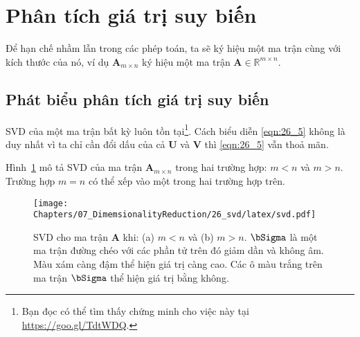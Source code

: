  
 
\section{Phân tích giá trị suy biến}
Để hạn chế nhầm lẫn trong các phép toán, ta sẽ ký hiệu một ma trận cùng với kích thước của nó, ví dụ $\mathbf{A}_{m \times n}$ ký hiệu một ma trận
$\mathbf{A} \in \mathbb{R}^{m \times n}$.
 
\subsection{Phát biểu phân tích giá trị suy biến}
{}

 
SVD của một ma trận bất kỳ luôn tồn tại\footnote{Bạn đọc có thể tìm thấy chứng
minh cho việc này tại \url{https://goo.gl/TdtWDQ}.}. Cách biểu diễn
\eqref{eqn:26_5} không là duy nhất vì ta chỉ cần đổi dấu của cả $\mathbf{U}$ và
$\mathbf{V}$ thì \eqref{eqn:26_5} vẫn thoả mãn.
 
Hình~\ref{fig:26_1} mô tả SVD của ma trận $\mathbf{A}_{m \times n}$ trong hai
trường hợp: $m < n$ và $m > n$. Trường hợp $m =n$ có thể xếp vào một trong hai
trường hợp trên.

\begin{figure}[t]
\centering
    \texttt{[image: Chapters/07\_DimemsionalityReduction/26\_svd/latex/svd.pdf]}
    \caption[]{SVD cho ma trận $\mathbf{A}$ khi: (a) $m < n$ và (b) $m > n$. $\bSigma$ là một ma trận đường chéo với các phần tử trên đó
    giảm dần và không âm. Màu xám càng đậm thể hiện giá trị càng cao. Các ô màu
    trắng trên ma trận $\bSigma$ thể hiện giá trị bằng không.}
    \label{fig:26_1}
\end{figure}
